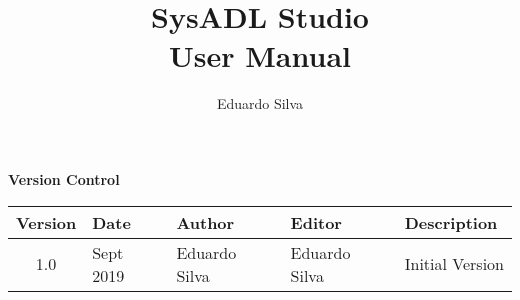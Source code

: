 \documentclass[]{report}
\title{SysADL Studio\\\small{User Manual}}
\author{Eduardo Silva}
\begin{document}
	\maketitle
	
	\begin{table*}
		\centering
		{\huge{\textbf{Version Control}}}\\
		\vspace{15px}
		\begin{tabular}{c | l | l | l | l }
			\hline
			\textbf{Version} & \textbf{Date} & \textbf{Author} & \textbf{Editor} & \textbf{Description} \\ \hline
			1.0 & Sept 2019 & Eduardo Silva & Eduardo Silva & Initial Version \\
			\hline
		\end{tabular}
	\end{table*}
	
	\tableofcontents
	
	
	
	
	
	
	
	
	
	
\end{document}
